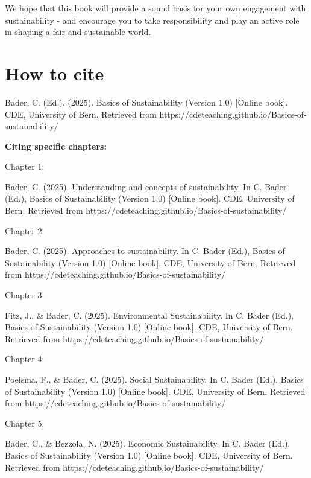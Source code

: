\documentclass[
  a4paper,
  openany]{book}
\begin{document}
We hope that this book will provide a sound basis for your own
engagement with sustainability - and encourage you to take
responsibility and play an active role in shaping a fair and sustainable
world.

\section*{How to cite}\label{how-to-cite}


Bader, C. (Ed.). (2025). Basics of Sustainability (Version 1.0)
{[}Online book{]}. CDE, University of Bern. Retrieved from
https://cdeteaching.github.io/Basics-of-sustainability/

\textbf{Citing specific chapters:}

Chapter 1:

Bader, C. (2025). Understanding and concepts of sustainability. In C.
Bader (Ed.), Basics of Sustainability (Version 1.0) {[}Online book{]}.
CDE, University of Bern. Retrieved from
https://cdeteaching.github.io/Basics-of-sustainability/

Chapter 2:

Bader, C. (2025). Approaches to sustainability. In C. Bader (Ed.),
Basics of Sustainability (Version 1.0) {[}Online book{]}. CDE,
University of Bern. Retrieved from
https://cdeteaching.github.io/Basics-of-sustainability/

Chapter 3:

Fitz, J., \& Bader, C. (2025). Environmental Sustainability. In C. Bader
(Ed.), Basics of Sustainability (Version 1.0) {[}Online book{]}. CDE,
University of Bern. Retrieved from
https://cdeteaching.github.io/Basics-of-sustainability/

Chapter 4:

Poelsma, F., \& Bader, C. (2025). Social Sustainability. In C. Bader
(Ed.), Basics of Sustainability (Version 1.0) {[}Online book{]}. CDE,
University of Bern. Retrieved from
https://cdeteaching.github.io/Basics-of-sustainability/

Chapter 5:

Bader, C., \& Bezzola, N. (2025). Economic Sustainability. In C. Bader
(Ed.), Basics of Sustainability (Version 1.0) {[}Online book{]}. CDE,
University of Bern. Retrieved from
https://cdeteaching.github.io/Basics-of-sustainability/
\end{document}
